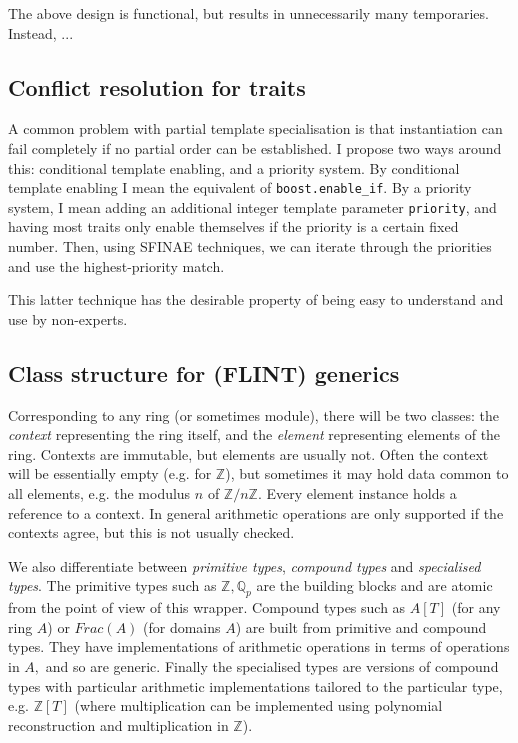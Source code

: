 \documentclass{scrartcl}
\begin{document}
The above design is functional, but results in unnecessarily many
temporaries. Instead, ...

\subsection*{Conflict resolution for traits}

A common problem with partial template specialisation is that instantiation
can fail completely if no partial order can be established. I propose two
ways around this: conditional template enabling, and a priority system. By
conditional template enabling I mean the equivalent of
\texttt{boost.enable\_if}. By a priority system, I mean adding an
additional integer template parameter \texttt{priority}, and having most
traits only enable themselves if the priority is a certain fixed number.
Then, using SFINAE techniques, we can iterate through the priorities and
use the highest-priority match.

This latter technique has the desirable property of being easy to
understand and use by non-experts.

\subsection*{Class structure for (FLINT) generics}

Corresponding to any ring (or sometimes module),
there will be two classes: the \emph{context}
representing the ring itself, and the \emph{element} representing elements
of the ring. Contexts are immutable, but elements are usually not. Often
the context will be essentially empty (e.g. for $\mathbb{Z}$), but
sometimes it may hold data common to all elements, e.g. the modulus $n$ of
$\mathbb{Z}/n\mathbb{Z}.$ Every element instance holds a reference to a
context. In general arithmetic operations are only supported if the
contexts agree, but this is not usually checked.

We also differentiate between \emph{primitive
types}, \emph{compound types} and \emph{specialised types}. The primitive
types such as $\mathbb{Z}, \mathbb{Q}_p$
are the building blocks and are atomic from the point of view of this
wrapper. Compound types such as $A[T]$ (for any ring $A$) or $Frac(A)$ (for
domains $A$) are built from primitive and compound types. They have
implementations of arithmetic operations in terms of operations in $A,$ and
so are generic. Finally the specialised types are versions of compound
types with particular arithmetic implementations tailored to the particular
type, e.g. $\mathbb{Z}[T]$ (where multiplication can be implemented using
polynomial reconstruction and multiplication in $\mathbb{Z}$).
\end{document}
